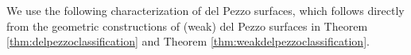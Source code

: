 \documentclass[a4paper, 11pt, reqno]{amsart}
\numberwithin{equation}{section} \numberwithin{figure}{section}
\DeclareMathOperator{\ord}{ord}
\def \F {{\mathbb F}}
\theoremstyle{definition}
\numberwithin{lemma}{section}
\begin{document}

We use the following characterization of del Pezzo surfaces, which follows directly from the geometric constructions of (weak) del Pezzo surfaces in Theorem \ref{thm:delpezzoclassification} and Theorem \ref{thm:weakdelpezzoclassification}.
\end{document}
